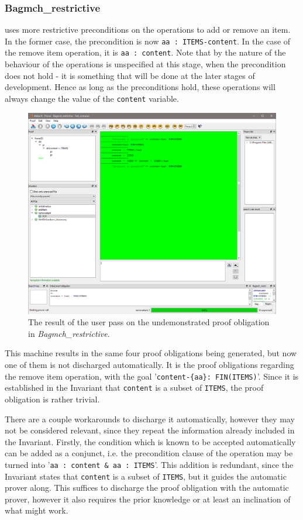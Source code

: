 \documentclass[11pt,journal]{IEEEtran}
\begin{document}
	\subsubsection{Bagmch\_restrictive} uses more restrictive preconditions on the operations to add or remove an item. In the former case, the precondition is now \texttt{aa : ITEMS-content}. In the case of the remove item operation, it is \texttt{aa : content}. Note that by the nature of the behaviour of the operations is unspecified at this stage, when the precondition does not hold - it is something that will be done at the later stages of development. Hence as long as the preconditions hold, these operations will always change the value of the \texttt{content} variable.
		\begin{figure}
		\centering
		\includegraphics[scale=0.5]{bagmch_restrictive_ip.png}
		\caption{The result of the user pass on the undemonstrated proof obligation in  \emph{Bagmch\_restrictive}.}
		
	\end{figure}
	This machine results in the same four proof obligations being generated, but now one of them is not discharged automatically. It is the proof obligations regarding the remove item operation, with the goal '\texttt{content-\{aa\}: FIN(ITEMS)}'. Since it is established in the Invariant that \texttt{content} is a subset of \texttt{ITEMS}, the proof obligation is rather trivial. 
	
	There are a couple workarounds to discharge it automatically, however they may not be considered relevant, since they repeat the information already included in the Invariant. Firstly, the condition which is known to be accepted automatically can be added as a conjunct, i.e. the precondition clause of the operation may be turned into '\texttt{aa : content \& aa : ITEMS}'. This addition is redundant, since the Invariant states that \texttt{content} is a subset of \texttt{ITEMS}, but it guides the automatic prover along. This suffices to discharge the proof obligation with the automatic prover, however it also requires the prior knowledge or at least an inclination of what might work.
	
\end{document}
